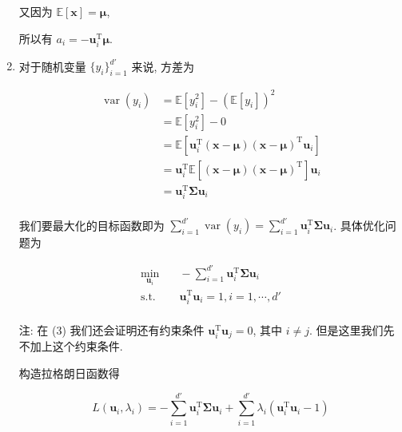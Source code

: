 \documentclass[answers]{exam}  %
\begin{document}
\begin{questions}
\begin{solution}
\begin{enumerate}
            又因为 $\mathbb{E}[\bm{x}] = \bm{\mu}$,

            所以有 $a_i = -\bm{u}_i^{\mathrm{T}}\bm{\mu}$.

      \item

            对于随机变量 $\{ y_i \}_{i=1}^{d'}$ 来说, 方差为

            $$
              \begin{aligned}
                \operatorname{var}(y_i) & = \mathbb{E}[y_i^{2}] - (\mathbb{E}[y_i])^{2}                                                  \\
                                        & = \mathbb{E}[y_i^{2}] - 0                                                                      \\
                                        & = \mathbb{E}[\bm{u}_i^{\mathrm{T}}(\bm{x} - \bm{\mu})(\bm{x} - \bm{\mu})^{\mathrm{T}}\bm{u}_i] \\
                                        & = \bm{u}_i^{\mathrm{T}}\mathbb{E}[(\bm{x} - \bm{\mu})(\bm{x} - \bm{\mu})^{\mathrm{T}}]\bm{u}_i \\
                                        & = \bm{u}_i^{\mathrm{T}}\bm{\Sigma}\bm{u}_i                                                     \\
              \end{aligned}
            $$

            我们要最大化的目标函数即为 $\displaystyle \sum_{i=1}^{d'}\operatorname{var}(y_i) = \sum_{i=1}^{d'}\bm{u}_i^{\mathrm{T}}\bm{\Sigma}\bm{u}_i$. 具体优化问题为

            $$
              \begin{aligned}
                \min_{\bm{u}_i} & \quad -\sum_{i=1}^{d'}\bm{u}_i^{\mathrm{T}}\bm{\Sigma}\bm{u}_i \\
                \text{s.t.}       & \quad \bm{u}_i^{\mathrm{T}}\bm{u}_i = 1, i = 1, \cdots, d' \\
              \end{aligned}
            $$

            注: 在 (3) 我们还会证明还有约束条件 $\bm{u}_i^{\mathrm{T}}\bm{u}_j = 0$, 其中 $i \neq j$. 但是这里我们先不加上这个约束条件.

            构造拉格朗日函数得

            $$
              L(\bm{u}_i, \lambda_i) = -\sum_{i=1}^{d'}\bm{u}_i^{\mathrm{T}}\bm{\Sigma}\bm{u}_i + \sum_{i=1}^{d'}\lambda_i(\bm{u}_i^{\mathrm{T}}\bm{u}_i - 1)
            $$


\end{enumerate}
\end{solution}
\end{questions}
\end{document}
